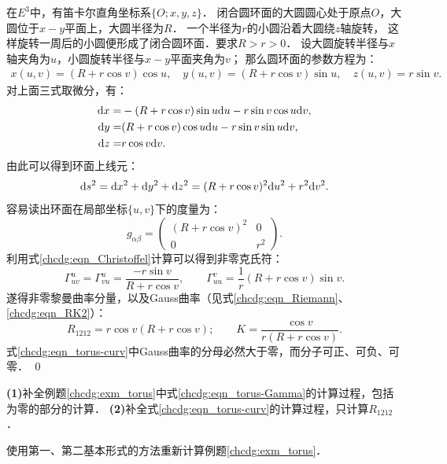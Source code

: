 在$E^3$中，有笛卡尔直角坐标系$\{O;x,y,z\}$．
闭合圆环面的大圆圆心处于原点$O$，大圆位于$x-y$平面上，大圆半径为$R$．
一个半径为$r$的小圆沿着大圆绕$z$轴旋转，
这样旋转一周后的小圆便形成了闭合圆环面．要求$R>r>0$．
设大圆旋转半径与$x$轴夹角为$u$，小圆旋转半径与$x-y$平面夹角为$v$；
那么圆环面的参数方程为：
\begin{align*}
		x(u,v)= (R+r \cos v )\cos u , \quad
		y(u,v)= (R+r \cos v )\sin u , \quad
		z(u,v)= r \sin v .
\end{align*}
对上面三式取微分，有：
\begin{align*}
	{\rm d}x = & -(R+r \cos v) \sin u {\rm d}u - r \sin v \cos u  {\rm d} v, \\
	{\rm d}y = & (R+r \cos v) \cos u {\rm d}u - r \sin v \sin u  {\rm d} v, \\
	{\rm d}z = & r \cos v {\rm d}v .
\end{align*}
由此可以得到环面上线元：
\begin{equation*}
	{\rm d}s^2 = {\rm d}x^2+{\rm d}y^2+{\rm d}z^2 = (R+r \cos v)^2  {\rm d}u^2 + r^2   {\rm d}v^2.
\end{equation*}
容易读出环面在局部坐标$\{u,v\}$下的度量为：
\begin{equation*}
	g_{\alpha\beta}= \begin{pmatrix}(R+r \cos v)^2 &0 \\ 0& r^2\end{pmatrix}.
\end{equation*}
利用式\eqref{chcdg:eqn_Christoffel}计算可以得到非零克氏符：
\begin{equation}\label{chcdg:eqn_torus-Gamma}
	\Gamma^u_{uv}=\Gamma^u_{vu}=\frac{-r \sin v}{R+r \cos v},\qquad
	\Gamma^v_{uu}=\frac{1}{r}(R+r \cos v) \sin v.
\end{equation}
遂得非零黎曼曲率分量，以及Gauss曲率（见式\eqref{chcdg:eqn_Riemann}、\eqref{chcdg:eqn_RK2}）：
\begin{equation}\label{chcdg:eqn_torus-curv}
	R_{1212}=r \cos v (R+r \cos v) ; \qquad  	K=\frac{\cos v}{r(R+r \cos v) } .
\end{equation}
式\eqref{chcdg:eqn_torus-curv}中Gauss曲率的分母必然大于零，而分子可正、可负、可零．
\qed


\begin{exercise}
	{\bfseries (1)}补全例题\ref{chcdg:exm_torus}中式\eqref{chcdg:eqn_torus-Gamma}的计算过程，包括为零的部分的计算．
	{\bfseries (2)}补全式\eqref{chcdg:eqn_torus-curv}的计算过程，只计算$R_{1212}$．
\end{exercise}

\begin{exercise}
	使用第一、第二基本形式的方法重新计算例题\ref{chcdg:exm_torus}．
\end{exercise}


